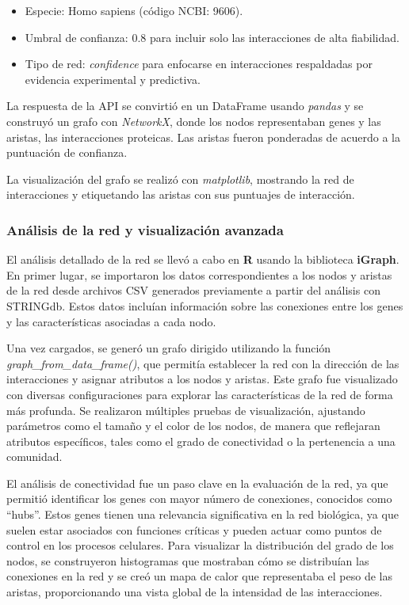 \begin{itemize}
	\item Especie: Homo sapiens (código NCBI: 9606).
	\item Umbral de confianza: 0.8 para incluir solo las interacciones de alta fiabilidad.
	\item Tipo de red: \textit{confidence} para enfocarse en interacciones respaldadas por evidencia experimental y predictiva.
\end{itemize}

La respuesta de la API se convirtió en un DataFrame usando \textit{pandas} y se construyó un grafo con \textit{NetworkX}, donde los nodos representaban genes y las aristas, las interacciones proteicas. Las aristas fueron ponderadas de acuerdo a la puntuación de confianza.

La visualización del grafo se realizó con \textit{matplotlib}, mostrando la red de interacciones y etiquetando las aristas con sus puntuajes de interacción.

\subsubsection{\textbf{Análisis de la red y visualización avanzada}}

El análisis detallado de la red se llevó a cabo en \textbf{R} usando la biblioteca \textbf{iGraph}. En primer lugar, se importaron los datos correspondientes a los nodos y aristas de la red desde archivos CSV generados previamente a partir del análisis con STRINGdb. Estos datos incluían información sobre las conexiones entre los genes y las características asociadas a cada nodo.

Una vez cargados, se generó un grafo dirigido utilizando la función \textit{graph\_from\_data\_frame()}, que permitía establecer la red con la dirección de las interacciones y asignar atributos a los nodos y aristas. Este grafo fue visualizado con diversas configuraciones para explorar las características de la red de forma más profunda. Se realizaron múltiples pruebas de visualización, ajustando parámetros como el tamaño y el color de los nodos, de manera que reflejaran atributos específicos, tales como el grado de conectividad o la pertenencia a una comunidad.

El análisis de conectividad fue un paso clave en la evaluación de la red, ya que permitió identificar los genes con mayor número de conexiones, conocidos como “hubs”. Estos genes tienen una relevancia significativa en la red biológica, ya que suelen estar asociados con funciones críticas y pueden actuar como puntos de control en los procesos celulares. Para visualizar la distribución del grado de los nodos, se construyeron histogramas que mostraban cómo se distribuían las conexiones en la red y se creó un mapa de calor que representaba el peso de las aristas, proporcionando una vista global de la intensidad de las interacciones.

